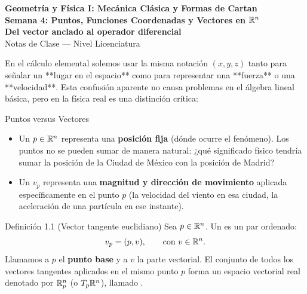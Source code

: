 \documentclass[11pt,letterpaper]{article}
\begin{document}
\setlength{\abovedisplayskip}{6pt}
\setlength{\belowdisplayskip}{6pt}
\setlength{\textfloatsep}{10pt}
\setlength{\intextsep}{8pt}
\color{blackmain}

\begin{center}
{\LARGE\textbf{Geometría y Física I: Mecánica Clásica y Formas de Cartan}}\\[0.25cm]
{\Large\textcolor{orangeacc}{\textbf{Semana 4: Puntos, Funciones Coordenadas y Vectores en $\mathbb{R}^n$}}}\\[0.15cm]
{\large\textbf{Del vector anclado al operador diferencial}}\\[0.3cm]
{\large\textcolor{graymuted}{Notas de Clase --- Nivel Licenciatura}}\\[0.2cm]
\end{center}

\vspace{0.2cm}


En el cálculo elemental solemos usar la misma notación $(x, y, z)$ tanto para señalar un **lugar en el espacio** como para representar una **fuerza** o una **velocidad**. Esta confusión aparente no causa problemas en el álgebra lineal básica, pero en la física real es una distinción crítica:

\begin{intuitionbox}{Puntos versus Vectores}
\begin{itemize}
    \item Un  $p \in \mathbb{R}^n$ representa una \textbf{posición fija} (dónde ocurre el fenómeno). Los puntos no se pueden sumar de manera natural: ¿qué significado físico tendría sumar la posición de la Ciudad de México con la posición de Madrid?
    \item Un  $v_p$ representa una \textbf{magnitud y dirección de movimiento} aplicada específicamente en el punto $p$ (la velocidad del viento en esa ciudad, la aceleración de una partícula en ese instante).
\end{itemize}
\end{intuitionbox}

\begin{infobox}[orangeacc]{Definición 1.1 (Vector tangente euclidiano)}
Sea $p \in \mathbb{R}^n$. Un  es un par ordenado:
\[
v_p = (p, v), \qquad \text{con } v \in \mathbb{R}^n.
\]
Llamamos a $p$ el \textbf{punto base} y a $v$ la parte vectorial. El conjunto de todos los vectores tangentes aplicados en el mismo punto $p$ forma un espacio vectorial real denotado por $\mathbb{R}^n_p$ (o $T_p\mathbb{R}^n$), llamado .
\end{infobox}
\end{document}
